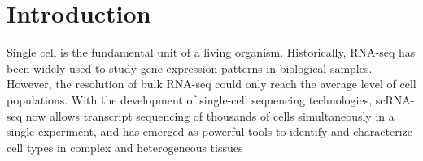 \documentclass[conference]{IEEEtran}
\begin{document}
\section{Introduction}
Single cell is the fundamental unit of a living organism.
Historically, RNA-seq has been widely used to study gene expression patterns in biological samples.
However, the resolution of bulk RNA-seq could only reach the average level of cell populations. 
With the development of single-cell sequencing technologies, scRNA-seq now allows transcript sequencing of thousands of cells simultaneously in a single experiment, and has emerged as powerful tools to identify and characterize cell types in complex and heterogeneous tissues~\cite{Zhang2019ComparativeAO}

\end{document}
